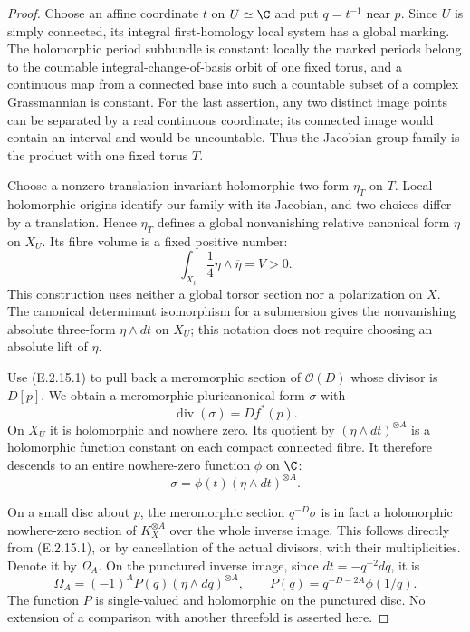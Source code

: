 \begin{proof}
Choose an affine coordinate $t$ on $U\simeq\C$ and put
$q=t^{-1}$ near $p$.  Since $U$ is simply connected, its
integral first-homology local system has a global marking.
The holomorphic period subbundle is constant: locally the
marked periods belong to the countable integral-change-of-basis
orbit of one fixed torus, and a continuous map from a connected
base into such a countable subset of a complex Grassmannian
is constant.  For the last assertion, any two distinct image
points can be separated by a real continuous coordinate;
its connected image would contain an interval and would be
uncountable.  Thus the Jacobian group family is the product
with one fixed torus $T$.

Choose a nonzero translation-invariant holomorphic two-form
$\eta_T$ on $T$.  Local holomorphic origins identify our
family with its Jacobian, and two choices differ by a
translation.  Hence $\eta_T$ defines a global nonvanishing
relative canonical form $\eta$ on $X_U$.  Its fibre volume
is a fixed positive number:
\[
 \int_{X_t}\frac14\eta\wedge\overline\eta=V>0.
 \tag{E.2.15.2}
\]
This construction uses neither a global torsor section nor
a polarization on $X$.  The canonical determinant
isomorphism for a submersion gives the nonvanishing
absolute three-form $\eta\wedge dt$ on $X_U$; this notation
does not require choosing an absolute lift of $\eta$.

Use (E.2.15.1) to pull back a meromorphic section of
$\mathcal O(D)$ whose divisor is $D[p]$.  We obtain a
meromorphic pluricanonical form $\sigma$ with
\[
 \operatorname{div}(\sigma)=D f^*(p).
\]
On $X_U$ it is holomorphic and nowhere zero.  Its quotient
by $(\eta\wedge dt)^{\otimes A}$ is a holomorphic function
constant on each compact connected fibre.  It therefore
descends to an entire nowhere-zero function $\phi$ on $\C$:
\[
 \sigma=\phi(t)(\eta\wedge dt)^{\otimes A}.
 \tag{E.2.15.3}
\]

On a small disc about $p$, the meromorphic section
$q^{-D}\sigma$ is in fact a holomorphic nowhere-zero section
of $K_X^{\otimes A}$ over the whole inverse image.  This
follows directly from (E.2.15.1), or by cancellation of the
actual divisors, with their multiplicities.  Denote it by
$\Omega_A$.  On the punctured inverse image, since
$dt=-q^{-2}dq$, it is
\[
 \Omega_A=(-1)^A P(q)(\eta\wedge dq)^{\otimes A},
 \qquad P(q)=q^{-D-2A}\phi(1/q).
 \tag{E.2.15.4}
\]
The function $P$ is single-valued and holomorphic on the
punctured disc.  No extension of a comparison with another
threefold is asserted here.


\end{proof}
